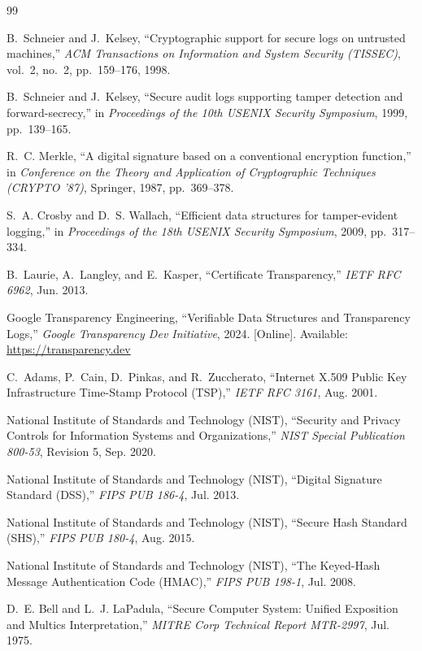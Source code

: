\documentclass{article}
\begin{document}
\newpage
\begin{thebibliography}{99}

B.~Schneier and J.~Kelsey,
``Cryptographic support for secure logs on untrusted machines,''
\emph{ACM Transactions on Information and System Security (TISSEC)}, vol.~2, no.~2, pp.~159--176, 1998.

B.~Schneier and J.~Kelsey,
``Secure audit logs supporting tamper detection and forward-secrecy,''
in \emph{Proceedings of the 10th USENIX Security Symposium}, 1999, pp.~139--165.

R.~C. Merkle,
``A digital signature based on a conventional encryption function,''
in \emph{Conference on the Theory and Application of Cryptographic Techniques (CRYPTO '87)}, Springer, 1987, pp.~369--378.

S.~A. Crosby and D.~S. Wallach,
``Efficient data structures for tamper-evident logging,''
in \emph{Proceedings of the 18th USENIX Security Symposium}, 2009, pp.~317--334.

B.~Laurie, A.~Langley, and E.~Kasper,
``Certificate Transparency,''
\emph{IETF RFC 6962}, Jun. 2013.

Google Transparency Engineering,
``Verifiable Data Structures and Transparency Logs,''
\emph{Google Transparency Dev Initiative}, 2024. [Online]. Available: \url{https://transparency.dev}

C.~Adams, P.~Cain, D.~Pinkas, and R.~Zuccherato,
``Internet X.509 Public Key Infrastructure Time-Stamp Protocol (TSP),''
\emph{IETF RFC 3161}, Aug. 2001.

National Institute of Standards and Technology (NIST),
``Security and Privacy Controls for Information Systems and Organizations,''
\emph{NIST Special Publication 800-53}, Revision 5, Sep. 2020.

National Institute of Standards and Technology (NIST),
``Digital Signature Standard (DSS),''
\emph{FIPS PUB 186-4}, Jul. 2013.

National Institute of Standards and Technology (NIST),
``Secure Hash Standard (SHS),''
\emph{FIPS PUB 180-4}, Aug. 2015.

National Institute of Standards and Technology (NIST),
``The Keyed-Hash Message Authentication Code (HMAC),''
\emph{FIPS PUB 198-1}, Jul. 2008.

D.~E. Bell and L.~J. LaPadula,
``Secure Computer System: Unified Exposition and Multics Interpretation,''
\emph{MITRE Corp Technical Report MTR-2997}, Jul. 1975.


\end{thebibliography}
\end{document}
